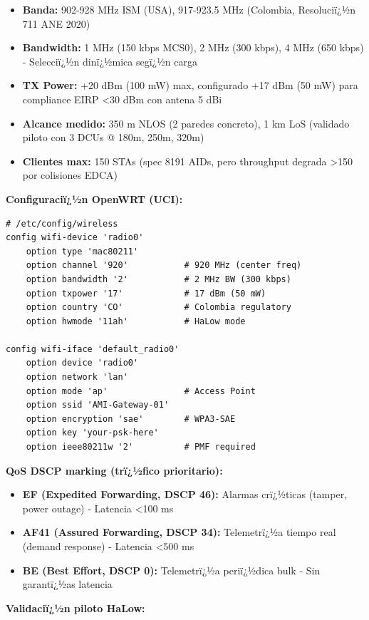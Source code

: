 \begin{itemize}
    \item \textbf{Banda:} 902-928 MHz ISM (USA), 917-923.5 MHz (Colombia, Resoluciï¿½n 711 ANE 2020)
    \item \textbf{Bandwidth:} 1 MHz (150 kbps MCS0), 2 MHz (300 kbps), 4 MHz (650 kbps) - Selecciï¿½n dinï¿½mica segï¿½n carga
    \item \textbf{TX Power:} +20 dBm (100 mW) max, configurado +17 dBm (50 mW) para compliance EIRP <30 dBm con antena 5 dBi
    \item \textbf{Alcance medido:} 350 m NLOS (2 paredes concreto), 1 km LoS (validado piloto con 3 DCUs @ 180m, 250m, 320m)
    \item \textbf{Clientes max:} 150 STAs (spec 8191 AIDs, pero throughput degrada >150 por colisiones EDCA)
\end{itemize}

\textbf{Configuraciï¿½n OpenWRT (UCI):}

\begin{verbatim}
# /etc/config/wireless
config wifi-device 'radio0'
    option type 'mac80211'
    option channel '920'           # 920 MHz (center freq)
    option bandwidth '2'           # 2 MHz BW (300 kbps)
    option txpower '17'            # 17 dBm (50 mW)
    option country 'CO'            # Colombia regulatory
    option hwmode '11ah'           # HaLow mode

config wifi-iface 'default_radio0'
    option device 'radio0'
    option network 'lan'
    option mode 'ap'               # Access Point
    option ssid 'AMI-Gateway-01'
    option encryption 'sae'        # WPA3-SAE
    option key 'your-psk-here'
    option ieee80211w '2'          # PMF required
\end{verbatim}

\textbf{QoS DSCP marking (trï¿½fico prioritario):}

\begin{itemize}
    \item \textbf{EF (Expedited Forwarding, DSCP 46):} Alarmas crï¿½ticas (tamper, power outage) - Latencia <100 ms
    \item \textbf{AF41 (Assured Forwarding, DSCP 34):} Telemetrï¿½a tiempo real (demand response) - Latencia <500 ms
    \item \textbf{BE (Best Effort, DSCP 0):} Telemetrï¿½a periï¿½dica bulk - Sin garantï¿½as latencia
\end{itemize}

\textbf{Validaciï¿½n piloto HaLow:}


